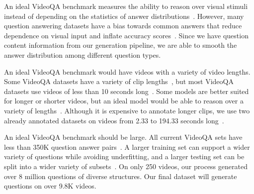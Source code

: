 \documentclass[10pt,twocolumn,letterpaper]{article}
\newcommand{\rak}[1]{{\color{red}{rak: #1}}}
\newcommand{\mgm}[1]{{\color{cyan}{mgm: #1}}}
\begin{document}
An ideal VideoQA benchmark measures the ability to reason over visual stimuli instead of depending on the statistics of answer distributions~\cite{vatashsky2020vqa}. However, many question answering datasets have a bias towards common answers that reduce dependence on visual input and inflate accuracy scores~\cite{goyal2017making, hudson2019gqa}. 
Since we have question content information from our generation pipeline, we are able to smooth the answer distribution among different question types. 

An ideal VideoQA benchmark would have videos with a variety of video lengths. Some VideoQA datasets have a variety of clip lengths~\cite{yu2019activitynet,xu2017video}, but most VideoQA datasets use videos of less than 10 seconds long~\cite{jang2017tgif,kim2017deepstory,xu2017video,maharaj2017dataset,zeng2016leveraging,yu2019activitynet}. Some models are better suited for longer or shorter videos, but an ideal model would be able to reason over a variety of lengths~\cite{na2017read,le2020hierarchical}. Although it is expensive to annotate longer clips, we use two already annotated datasets on videos from 2.33 to 194.33 seconds long~\cite{sigurdsson2016hollywood,ji2020action}.

An ideal VideoQA benchmark should be large. All current VideoQA sets have less than 350K question answer pairs~\cite{jang2017tgif,kim2017deepstory,xu2017video,maharaj2017dataset,zeng2016leveraging,yu2019activitynet,lei2018tvqa,tapaswi2016movieqa}. A larger training set can support a wider variety of questions while avoiding underfitting, and a larger testing set can be split into a wider variety of subsets~\cite{maharaj2017dataset}. On only 250 videos, our process generated over 8 million questions of diverse structures. Our final dataset will generate questions on over 9.8K videos.
\end{document}
